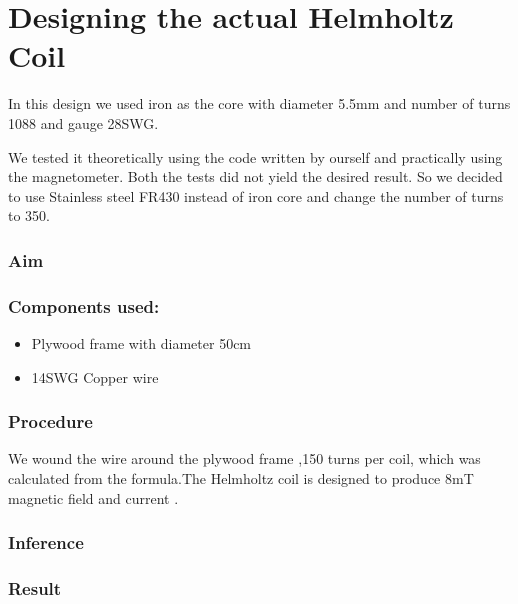 \chapter{Designing the actual Helmholtz Coil}

\vspace{15pt}

In this design we used iron as the core with diameter 5.5mm and number of turns 1088 and gauge 28SWG. 

We tested it theoretically using the code written by ourself and practically using the magnetometer. Both the tests did not yield the desired result. So we decided to use Stainless steel FR430 instead of iron core and change the number of turns to 350.



\subsection{Aim}

\subsection{Components used:}

\vspace{15pt}

\begin{itemize}

  \item Plywood frame with diameter 50cm
  \item 14SWG Copper wire
  
\end{itemize}



\subsection{Procedure}
We wound the wire around the plywood frame ,150 turns per coil, which was calculated from the formula.The Helmholtz coil is designed to produce 8mT magnetic field and   current .


\subsection{Inference}

\subsection{Result}

